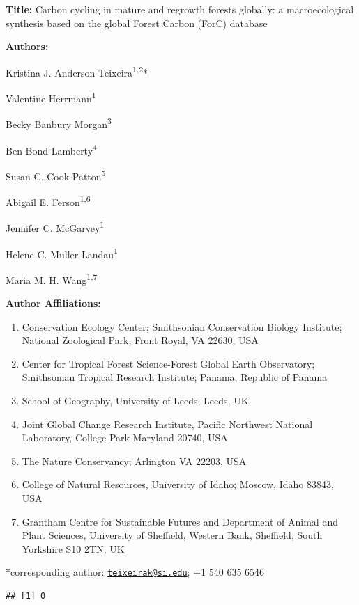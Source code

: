 \documentclass[
]{article}
\author{}
\date{\vspace{-2.5em}}
\providecommand{\tightlist}{%
  \setlength{\itemsep}{0pt}\setlength{\parskip}{0pt}}
\begin{document}
\raggedright

\textbf{Title:} Carbon cycling in mature and regrowth forests globally:
a macroecological synthesis based on the global Forest Carbon (ForC)
database

\textbf{Authors:}

Kristina J. Anderson-Teixeira\textsuperscript{1,2}*

Valentine Herrmann\textsuperscript{1}

Becky Banbury Morgan\textsuperscript{3}

Ben Bond-Lamberty\textsuperscript{4}

Susan C. Cook-Patton\textsuperscript{5}

Abigail E. Ferson\textsuperscript{1,6}

Jennifer C. McGarvey\textsuperscript{1}

Helene C. Muller-Landau\textsuperscript{1}

Maria M. H. Wang\textsuperscript{1,7}

\textbf{Author Affiliations:}

\begin{enumerate}
\def\labelenumi{\arabic{enumi}.}
\tightlist
\item
  Conservation Ecology Center; Smithsonian Conservation Biology
  Institute; National Zoological Park, Front Royal, VA 22630, USA
\item
  Center for Tropical Forest Science-Forest Global Earth Observatory;
  Smithsonian Tropical Research Institute; Panama, Republic of Panama
\item
  School of Geography, University of Leeds, Leeds, UK
\item
  Joint Global Change Research Institute, Pacific Northwest National
  Laboratory, College Park Maryland 20740, USA
\item
  The Nature Conservancy; Arlington VA 22203, USA
\item
  College of Natural Resources, University of Idaho; Moscow, Idaho
  83843, USA
\item
  Grantham Centre for Sustainable Futures and Department of Animal and
  Plant Sciences, University of Sheffield, Western Bank, Sheffield,
  South Yorkshire S10 2TN, UK
\end{enumerate}

*corresponding author:
\href{mailto:teixeirak@si.edu}{\nolinkurl{teixeirak@si.edu}}; +1 540 635
6546

\begin{verbatim}
## [1] 0
\end{verbatim}
\end{document}
